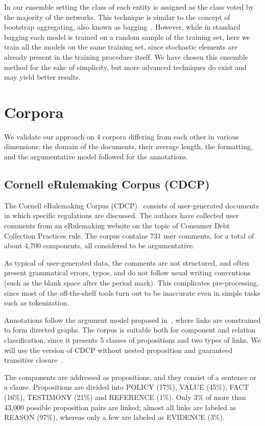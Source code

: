 \documentclass[journal]{IEEEtran}
\begin{document}
In our ensemble setting the class of each entity is assigned as the class voted by the majority of the networks. This technique is similar to the concept of bootstrap aggregating, also known as bagging~\cite{bagging}. However, while in standard bagging each model is trained on a random sample of the training set, here we train all the models on the same training set, since stochastic elements are already present in the training procedure itself. We have chosen this ensemble method for the sake of simplicity, but more advanced techniques do exist and may yield better results\cite{ensemblesurvey}. 
\section{Corpora}
\label{sec:corpora}
We validate our approach on 4 corpora differing from each other in various dimensions: the domain of the documents, their average length, the formatting, and the argumentative model followed for the annotations.


\subsection{Cornell eRulemaking Corpus (CDCP)}

The Cornell eRulemaking Corpus (CDCP)~\cite{DBLP:conf/acl/NiculaePC17,park-cardie-2018-corpus} consists of user-generated documents in which specific regulations are discussed. The authors have collected user comments from an eRulemaking website on the topic of Consumer Debt Collection Practices rule.
The corpus contains 731 user comments, for a total of about 4,700 components,  all considered to be argumentative.

As typical of user-generated data, the comments are not structured, and often present grammatical errors, typos, and do not follow usual writing conventions (such as the blank space after the period mark). This complicates pre-processing, since most of the off-the-shelf tools turn out to be inaccurate even in simple tasks such as tokenization.

Annotations follow the argument model proposed in~\cite{park2015toward}, where links are constrained to form directed graphs. The corpus is suitable both for component and relation classification, since it presents 5 classes of propositions and two types of links.
We will use the version of CDCP without nested proposition and guaranteed transitive closure~\cite{DBLP:conf/acl/NiculaePC17}.


The components are addressed as propositions, and they consist of a sentence or a clause.
Propositions are divided into POLICY (17\%), VALUE (45\%), FACT (16\%), TESTIMONY (21\%) and REFERENCE (1\%). Only 3\% of more than 43,000 possible proposition pairs are linked; almost all links are labeled as REASON (97\%), whereas only a few are labeled as EVIDENCE (3\%). 
\end{document}
